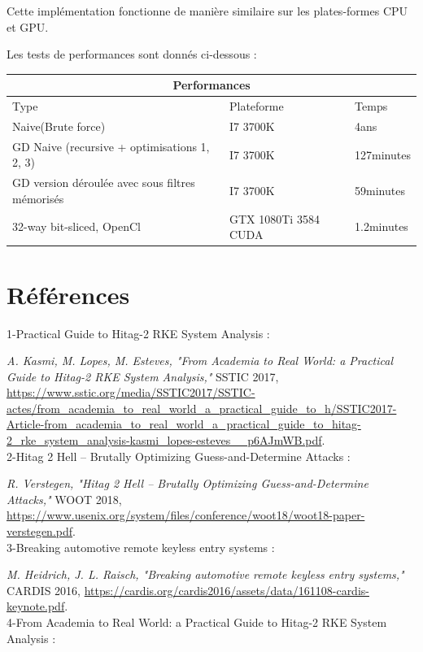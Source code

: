 \documentclass{template}
\begin{document}
Cette implémentation fonctionne de manière similaire sur les plates-formes CPU et GPU.

Les tests de performances sont donnés ci-dessous :


\begin{tabular}{|l|l|l|}
  \hline
  \multicolumn{3}{|c|}{Performances} \\
  \hline
  Type & Plateforme & Temps  \\ \hline
  \multirow{}{}{Naive(Brute force)} & I7 3700K & 4ans  \\ \hline  
  \multirow{}{}{GD Naive (recursive + optimisations 1, 2, 3)} & I7 3700K & 127minutes \\ \hline
  \multirow{}{}{GD version déroulée avec sous filtres mémorisés} & I7 3700K & 59minutes \\ \hline
  \multirow{}{}{32-way bit-sliced, OpenCl} & GTX 1080Ti 3584 CUDA & 1.2minutes \\ \hline
\end{tabular}

\chapter{Références}
1-Practical Guide to Hitag-2 RKE System Analysis :

\textit{A. Kasmi, M. Lopes, M. Esteves, "From Academia to Real World: a Practical Guide to Hitag-2 RKE System Analysis,"} SSTIC 2017, \url{https://www.sstic.org/media/SSTIC2017/SSTIC-actes/from_academia_to_real_world_a_practical_guide_to_h/SSTIC2017-Article-from_academia_to_real_world_a_practical_guide_to_hitag-2_rke_system_analysis-kasmi_lopes-esteves__p6AJmWB.pdf}.\\


2-Hitag 2 Hell – Brutally Optimizing Guess-and-Determine Attacks :

\textit{R. Verstegen, "Hitag 2 Hell – Brutally Optimizing Guess-and-Determine Attacks,"} WOOT 2018, \url{https://www.usenix.org/system/files/conference/woot18/woot18-paper-verstegen.pdf}.\\

3-Breaking automotive remote keyless entry systems :

\textit{M. Heidrich, J. L. Raisch, "Breaking automotive remote keyless entry systems,"} CARDIS 2016, \url{https://cardis.org/cardis2016/assets/data/161108-cardis-keynote.pdf}.\\

4-From Academia to Real World: a Practical Guide to Hitag-2 RKE System Analysis :
\end{document}

